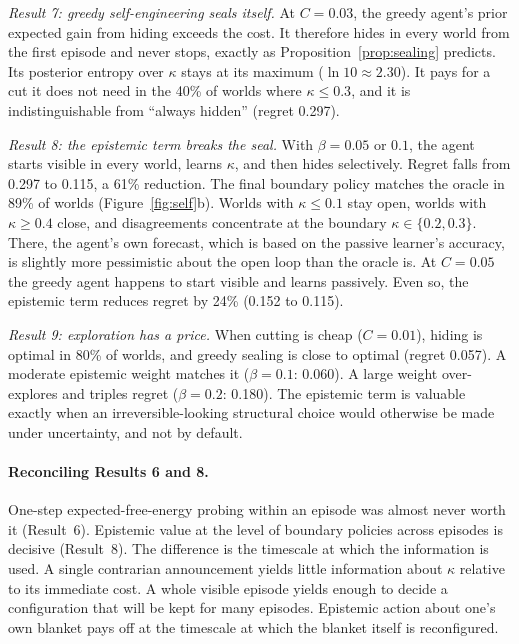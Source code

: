 \documentclass[11pt]{article}
\theoremstyle{definition}
\theoremstyle{remark}
\begin{document}
\emph{Result 7: greedy self-engineering seals itself.} At $C=0.03$, the greedy
agent's prior expected gain from hiding exceeds the cost. It therefore hides in
every world from the first episode and never stops, exactly as
Proposition~\ref{prop:sealing} predicts. Its posterior entropy over $\kappa$
stays at its maximum ($\ln10\approx2.30$). It pays for a cut it does not need
in the 40\% of worlds where $\kappa\le0.3$, and it is indistinguishable from
``always hidden'' (regret 0.297).

\emph{Result 8: the epistemic term breaks the seal.} With $\beta=0.05$ or $0.1$,
the agent starts visible in every world, learns $\kappa$, and then hides
selectively. Regret falls from 0.297 to 0.115, a 61\% reduction. The final
boundary policy matches the oracle in 89\% of worlds (Figure~\ref{fig:self}b).
Worlds with $\kappa\le0.1$ stay open, worlds with $\kappa\ge0.4$ close, and
disagreements concentrate at the boundary $\kappa\in\{0.2,0.3\}$. There, the
agent's own forecast, which is based on the passive learner's accuracy, is
slightly more pessimistic about the open loop than the oracle is. At $C=0.05$
the greedy agent happens to start visible and learns passively. Even so, the
epistemic term reduces regret by 24\% (0.152 to 0.115).

\emph{Result 9: exploration has a price.} When cutting is cheap ($C=0.01$),
hiding is optimal in 80\% of worlds, and greedy sealing is close to optimal
(regret 0.057). A moderate epistemic weight matches it ($\beta=0.1$: 0.060).
A large weight over-explores and triples regret ($\beta=0.2$: 0.180). The
epistemic term is valuable exactly when an irreversible-looking structural
choice would otherwise be made under uncertainty, and not by default.

\paragraph{Reconciling Results 6 and 8.} One-step expected-free-energy probing
within an episode was almost never worth it (Result~6). Epistemic value at the
level of boundary policies across episodes is decisive (Result~8). The
difference is the timescale at which the information is used. A single
contrarian announcement yields little information about $\kappa$ relative to
its immediate cost. A whole visible episode yields enough to decide a
configuration that will be kept for many episodes. Epistemic action about one's
own blanket pays off at the timescale at which the blanket itself is
reconfigured.
\end{document}
